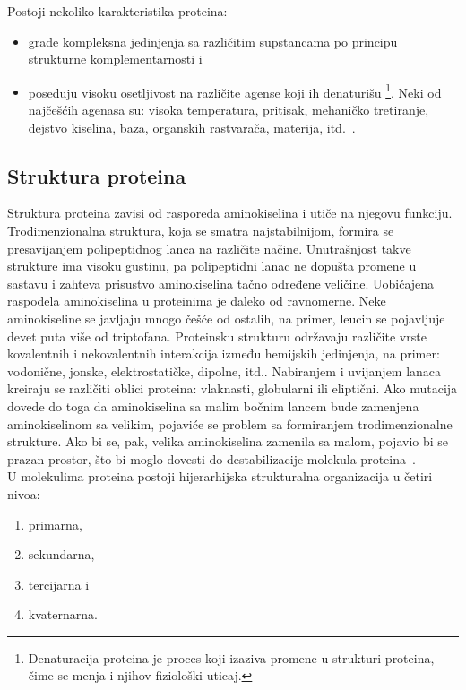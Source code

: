 Postoji nekoliko karakteristika proteina:
\begin{itemize}
\item grade kompleksna jedinjenja sa različitim supstancama po principu strukturne komplementarnosti i  
\item poseduju visoku osetljivost na različite agense koji ih denaturišu \footnote{Denaturacija proteina je proces koji izaziva promene u strukturi proteina, čime se menja i njihov fiziološki uticaj.}. Neki od najčešćih agenasa su: visoka temperatura, pritisak, mehaničko tretiranje, dejstvo kiselina, baza, organskih rastvarača, materija, itd.~\cite{spasic,JKd}.
\end{itemize}
 
\subsection{Struktura proteina}
Struktura proteina zavisi od rasporeda aminokiselina i utiče na njegovu funkciju. Trodimenzionalna struktura, koja se smatra najstabilnijom, formira se presavijanjem polipeptidnog lanca na različite načine. Unutrašnjost takve strukture ima visoku gustinu, pa polipeptidni lanac ne dopušta promene u sastavu i zahteva prisustvo aminokiselina tačno određene veličine. Uobičajena raspodela aminokiselina u proteinima je daleko od ravnomerne. Neke aminokiseline se javljaju mnogo češće od ostalih, na primer, leucin se pojavljuje devet puta više od triptofana.
Proteinsku strukturu održavaju različite vrste kovalentnih i nekovalentnih interakcija između hemijskih jedinjenja, na primer: vodonične, jonske, elektrostatičke, dipolne, itd.. Nabiranjem i uvijanjem lanaca kreiraju se različiti oblici proteina: vlaknasti, globularni ili eliptični. Ako mutacija dovede do toga da aminokiselina sa malim bočnim lancem bude zamenjena aminokiselinom sa velikim, pojaviće se problem sa formiranjem trodimenzionalne strukture. Ako bi se, pak, velika aminokiselina zamenila sa malom, pojavio bi se prazan prostor, što bi moglo dovesti do destabilizacije molekula proteina~\cite{spasic,biopathways,medbio}. \\
U molekulima proteina postoji hijerarhijska strukturalna organizacija u četiri nivoa:
\begin{enumerate}
\item primarna,
\item sekundarna,
\item tercijarna i
\item kvaternarna.
\end{enumerate}
